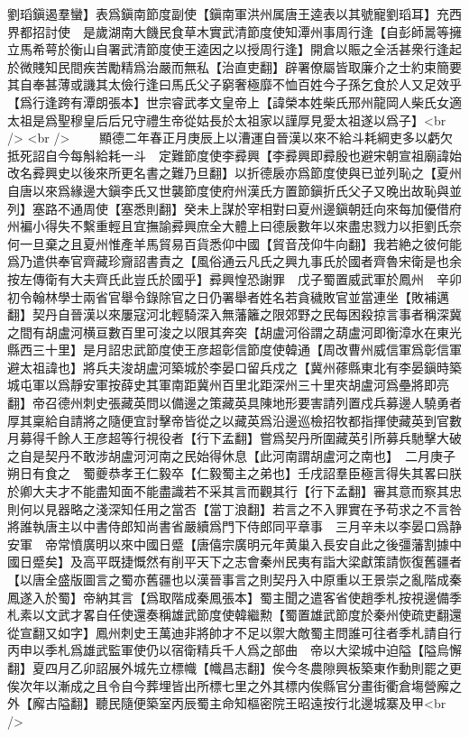 劉瑫鎭遏羣蠻】表爲鎭南節度副使【鎭南軍洪州属唐王逵表以其號寵劉瑫耳】充西界都招討使　是歲湖南大饑民食草木實武清節度使知潭州事周行逢【自彭師暠等擁立馬希萼於衡山自署武清節度使王逵因之以授周行逢】開倉以賑之全活甚衆行逢起於微賤知民間疾苦勵精爲治嚴而無私【治直吏翻】辟署僚屬皆取廉介之士約束簡要其自奉甚薄或譏其太儉行逢曰馬氏父子窮奢極靡不恤百姓今子孫乞食於人又足效乎【爲行逢跨有潭朗張本】世宗睿武孝文皇帝上【諱榮本姓柴氏邢州龍岡人柴氏女適太祖是爲聖穆皇后后兄守禮生帝從姑長於太祖家以謹厚見愛太祖遂以爲子】<br />
<br />
　　顯德二年春正月庚辰上以漕運自晉漢以來不給斗耗綱吏多以虧欠抵死詔自今每斛給耗一斗　定難節度使李彛興【李彛興即彛殷也避宋朝宣祖廟諱始改名彛興史以後來所更名書之難乃旦翻】以折德扆亦爲節度使與已並列恥之【夏州自唐以來爲緣邊大鎭李氏又世襲節度使府州漢氏方置節鎭折氏父子又晚出故恥與並列】塞路不通周使【塞悉則翻】癸未上謀於宰相對曰夏州邊鎭朝廷向來每加優借府州褊小得失不繫重輕且宜撫諭彛興庶全大體上曰德扆數年以來盡忠戮力以拒劉氏奈何一旦棄之且夏州惟產羊馬貿易百貨悉仰中國【貿音茂仰牛向翻】我若絶之彼何能爲乃遣供奉官齊藏珍齎詔書責之【風俗通云凡氏之興九事氏於國者齊魯宋衛是也余按左傳衛有大夫齊氏此豈氏於國乎】彛興惶恐謝罪　戊子蜀置威武軍於鳳州　辛卯初令翰林學士兩省官舉令錄除官之日仍署舉者姓名若貪穢敗官並當連坐【敗補邁翻】契丹自晉漢以來屢寇河北輕騎深入無藩籬之限郊野之民每困殺掠言事者稱深冀之間有胡盧河横亘數百里可浚之以限其奔突【胡盧河俗謂之葫盧河即衡漳水在東光縣西三十里】是月詔忠武節度使王彦超彰信節度使韓通【周改曹州威信軍爲彰信軍避太祖諱也】將兵夫浚胡盧河築城於李晏口留兵戍之【冀州蓚縣東北有李晏鎭時築城屯軍以爲靜安軍按薛史其軍南距冀州百里北距深州三十里夾胡盧河爲壘將即亮翻】帝召德州刺史張藏英問以備邊之策藏英具陳地形要害請列置戍兵募邊人驍勇者厚其稟給自請將之隨便宜討擊帝皆從之以藏英爲沿邊巡檢招牧都指揮使藏英到官數月募得千餘人王彦超等行視役者【行下孟翻】嘗爲契丹所圍藏英引所募兵馳擊大破之自是契丹不敢涉胡盧河河南之民始得休息【此河南謂胡盧河之南也】　二月庚子朔日有食之　蜀夔恭孝王仁毅卒【仁毅蜀主之弟也】壬戌詔羣臣極言得失其畧曰朕於卿大夫才不能盡知面不能盡識若不采其言而觀其行【行下孟翻】審其意而察其忠則何以見器略之淺深知任用之當否【當丁浪翻】若言之不入罪實在予苟求之不言咎將誰執唐主以中書侍郎知尚書省嚴續爲門下侍郎同平章事　三月辛未以李晏口爲静安軍　帝常憤廣明以來中國日蹙【唐僖宗廣明元年黄巢入長安自此之後彊藩割據中國日蹙矣】及高平既捷慨然有削平天下之志會秦州民夷有詣大梁獻策請恢復舊疆者【以唐全盛版圖言之蜀亦舊疆也以漢晉事言之則契丹入中原重以王景崇之亂階成秦鳳遂入於蜀】帝納其言【爲取階成秦鳳張本】蜀主聞之遣客省使趙季札按視邊備季札素以文武才畧自任使還奏稱雄武節度使韓繼勲【蜀置雄武節度於秦州使疏吏翻還從宣翻又如字】鳳州刺史王萬迪非將帥才不足以禦大敵蜀主問誰可往者季札請自行丙申以季札爲雄武監軍使仍以宿衛精兵千人爲之部曲　帝以大梁城中迫隘【隘烏懈翻】夏四月乙卯詔展外城先立標幟【幟昌志翻】俟今冬農隙興板築東作動則罷之更俟次年以漸成之且令自今葬埋皆出所標七里之外其標内俟縣官分畫街衢倉塲營廨之外【廨古隘翻】聽民隨便築室丙辰蜀主命知樞密院王昭遠按行北邊城寨及甲<br />
